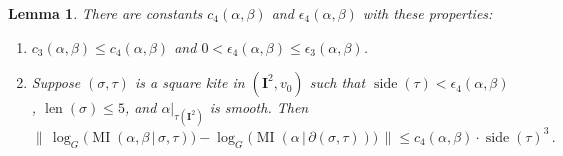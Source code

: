 \documentclass[10pt, a4paper]{amsart}
\newtheorem{lem}[equation]{Lemma}
\theoremstyle{definition}
\numberwithin{equation}{section}
\newcommand{\opn}{\operatorname}
\newcommand{\mbf}[1]{\mathbf{#1}}
\newcommand{\Norm}[1]{\bigl\lVert\, #1 \, \bigr\rVert}
\renewcommand{\vert}{\, | \,}
\begin{document}
\begin{lem} \label{lem:10}
There are constants $c_4(\alpha, \beta)$ and
$\epsilon_4(\alpha, \beta)$ with these properties:
\begin{enumerate}
\item $c_3(\alpha, \beta) \leq c_4(\alpha, \beta)$ and
$0 < \epsilon_4(\alpha, \beta) \leq \epsilon_3(\alpha, \beta)$.
\item Suppose $(\sigma, \tau)$ is a square kite in $(\mbf{I}^2, v_0)$
such that 
$\opn{side}(\tau) < \epsilon_4(\alpha, \beta)$, \linebreak
$\opn{len}(\sigma) \leq 5$, and $\alpha|_{\tau(\mbf{I}^2)}$ is smooth.
Then
\[ \Norm{ \log_G \bigl( \opn{MI} (\alpha, \beta \vert \sigma, \tau) \bigr) -
\log_G \bigl( \opn{MI} (\alpha \vert \partial(\sigma, \tau)) \bigr) }
\leq c_4(\alpha, \beta) \cdot \opn{side}(\tau)^3  \, . \]
\end{enumerate}
\end{lem}
\end{document}
